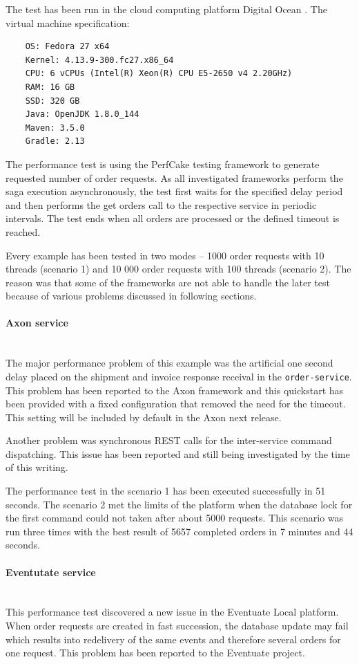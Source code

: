 \documentclass[oneside,
  digital, %
  table,   %
  nolof,     %
  nolot,     %
]{fithesis3}
\newcommand{\newlinepar}[1]{\paragraph{#1}\needspace{4\baselineskip}\mbox{}\\}
\begin{document}
The test has been run in the cloud computing platform Digital Ocean \cite{digital-ocean}. The virtual machine specification:

\begin{verbatim}
    OS: Fedora 27 x64
    Kernel: 4.13.9-300.fc27.x86_64
    CPU: 6 vCPUs (Intel(R) Xeon(R) CPU E5-2650 v4 2.20GHz)
    RAM: 16 GB
    SSD: 320 GB
    Java: OpenJDK 1.8.0_144
    Maven: 3.5.0
    Gradle: 2.13
\end{verbatim}

The performance test is using the PerfCake \cite{perfcake} testing framework to generate requested number of order requests. As all investigated frameworks perform the saga execution asynchronously, the test first waits for the specified delay period and then performs the get orders call to the respective service in periodic intervals. The test ends when all orders are processed or the defined timeout is reached.

Every example has been tested in two modes -- 1000 order requests with 10 threads (scenario 1) and 10 000 order requests with 100 threads (scenario 2). The reason was that some of the frameworks are not able to handle the later test because of various problems discussed in following sections.

\newlinepar{Axon service}

The major performance problem of this example was the artificial one second delay placed on the shipment and invoice response receival in the \texttt{order-service}. This problem has been reported to the Axon framework and this quickstart has been provided with a fixed configuration that removed the need for the timeout. This setting will be included by default in the Axon next release. 

Another problem was synchronous REST calls for the inter-service command dispatching. This issue has been reported and still being investigated by the time of this writing.

The performance test in the scenario 1 has been executed successfully in 51 seconds. The scenario 2 met the limits of the platform when the database lock for the first command could not taken after about 5000 requests. This scenario was run three times with the best result of 5657 completed orders in 7 minutes and 44 seconds.

\newlinepar{Eventutate service}

This performance test discovered a new issue in the Eventuate Local platform. When order requests are created in fast succession, the database update may fail which results into redelivery of the same events and therefore several orders for one request. This problem has been reported to the Eventuate project.
\end{document}
